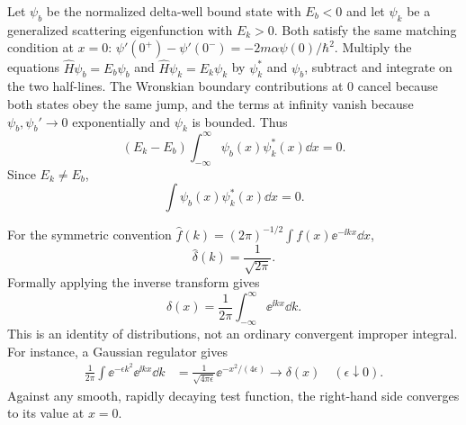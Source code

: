 Let $\psi_b$ be the normalized delta-well bound state
with $E_b<0$ and let $\psi_k$ be a generalized scattering
eigenfunction with $E_k>0$. Both satisfy the same matching
condition at $x=0$:
$\psi'(0^+)-\psi'(0^-)=-2m\alpha\psi(0)/\hbar^2$.
Multiply the equations $\hat H\psi_b=E_b\psi_b$
and $\hat H\psi_k=E_k\psi_k$ by $\psi_k^*$
and $\psi_b$, subtract and integrate on the two
half-lines. The Wronskian boundary contributions at
$0$ cancel because both states obey the same jump,
and the terms at infinity vanish because
$\psi_b,\psi_b'\to0$ exponentially and $\psi_k$ is bounded.
Thus
\begin{equation}
(E_k-E_b)\int_{-\infty}^\infty\psi_b(x)\psi_k^*(x)\dd x=0.
\end{equation}
Since $E_k\ne E_b$,
\begin{equation}
\boxed{\int\psi_b(x)\psi_k^*(x)\dd x=0}.
\end{equation}

For the symmetric convention
$\widehat f(k)=(2\pi)^{-1/2}
\int f(x)\ee^{-\ii kx}\dd x$,
\begin{equation}
\boxed{\widehat\delta(k)=\frac1{\sqrt{2\pi}}}.
\end{equation}
Formally applying the inverse transform gives
\begin{equation}
\boxed{\delta(x)=\frac1{2\pi}
\int_{-\infty}^\infty\ee^{\ii kx}\dd k}.
\end{equation}
This is an identity of distributions, not an
ordinary convergent improper integral.
For instance, a Gaussian regulator gives
\begin{align}
\frac1{2\pi}\int\ee^{-\epsilon k^2}
\ee^{\ii kx}\dd k
&=\frac1{\sqrt{4\pi\epsilon}}
\ee^{-x^2/(4\epsilon)}
\longrightarrow\delta(x)
\quad(\epsilon\downarrow0).
\end{align}
Against any smooth, rapidly decaying test function,
the right-hand side converges to its value at $x=0$.

